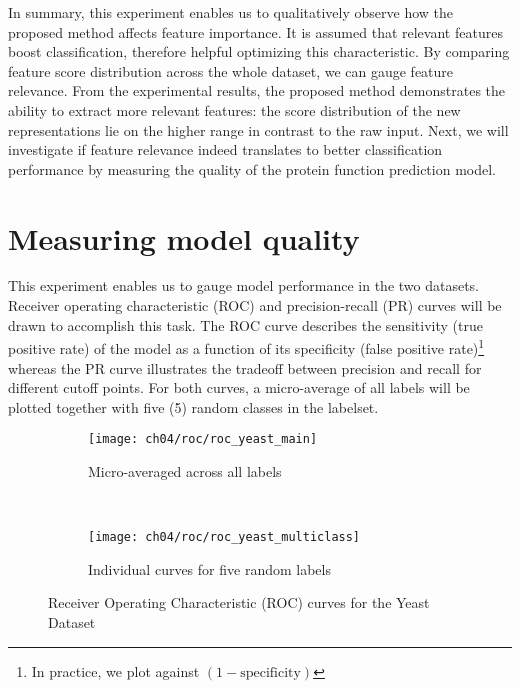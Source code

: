 \par In summary, this experiment enables us to qualitatively observe how the
proposed method affects feature importance.  It is assumed that relevant
features boost classification, therefore helpful optimizing this
characteristic. By comparing feature score distribution across the whole
dataset, we can gauge feature relevance. From the experimental results, the
proposed method demonstrates the ability to extract more relevant features: the
score distribution of the new representations lie on the higher range in
contrast to the raw input. Next, we will investigate if feature relevance
indeed translates to better classification performance by measuring the quality
of the protein function prediction model.

\newpage
\section{Measuring model quality}
\label{ModelQuality}

\par This experiment enables us to gauge model performance in the two datasets.
Receiver operating characteristic (ROC) and precision-recall (PR) curves will
be drawn to accomplish this task. The ROC curve describes the sensitivity (true
positive rate) of the model as a function of its specificity (false positive
rate)\footnote[2]{In practice, we plot against $(1-\text{specificity})$} whereas
the PR curve illustrates the tradeoff between precision and recall for
different cutoff points. For both curves, a micro-average of all labels
will be plotted together with five (5) random classes in the labelset.

\begin{figure}[t]
    \centering
    \begin{subfigure}[b]{0.45\textwidth}
        \texttt{[image: ch04/roc/roc\_yeast\_main]}
        \caption{Micro-averaged across all labels}
        \label{results:roc_yeast_main}
    \end{subfigure}
    ~ %
    \begin{subfigure}[b]{0.45\textwidth}
        \texttt{[image: ch04/roc/roc\_yeast\_multiclass]}
        \caption{Individual curves for five random labels}
        \label{results:roc_yeast_multiclass}
    \end{subfigure}
    \caption{Receiver Operating Characteristic (ROC) curves for the Yeast
    Dataset}
    \label{results:roc_yeast}
\end{figure}



